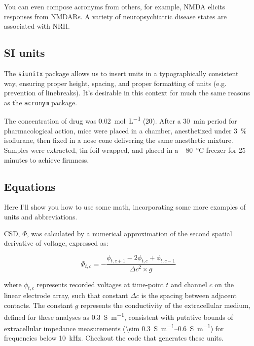\documentclass[../../main.tex]{subfiles}  %
\begin{document}
	You can even compose acronyms from others, for example, \ac{NMDA} elicits responses from \acp{NMDAR}. 
	A variety of neuropsychiatric disease states are associated with \ac{NRH}.

	\subsection{SI units}

	The \verb|siunitx| package allows us to insert units in a typographically consistent way, ensuring proper height, spacing, and proper formatting of units (e.g. prevention of linebreaks).
	It's desirable in this context for much the same reasons as the \verb|acronym| package.


	The concentration of drug was \SI[per-mode=fraction]{0.02}{\mol\per\L} (\SI{20}{\mM}).
	After a \SI{30}{\minute} period for pharmacological action, mice were placed in a chamber, anesthetized under \qty{3}{\percent} isoflurane, then fixed in a nose cone delivering the same anesthetic mixture. 
	Samples were extracted, tin foil wrapped, and placed in a \SI{-80}{\degreeCelsius} freezer for 25 minutes to achieve firmness.

	\subsection{Equations}

	Here I'll show you how to use some math, incorporating some more examples of units and abbreviations.

	\Acf{CSD}, $\Phi$, was calculated by a numerical approximation of the second spatial derivative of voltage, expressed as:

	\begin{equation}
		\Phi_{t, c} = -\frac{\phi_{t, c+1} - 2\phi_{t, c} + \phi_{t, c-1}}{\Delta c^2 \times g}
	\end{equation}

	where $\phi_{t, c}$ represents recorded voltages at time-point $t$ and channel $c$ on the linear electrode array, such that constant $\Delta c$ is the spacing between adjacent contacts. 
	The constant $g$ represents the conductivity of the extracellular medium, defined for these analyses as \SI[per-mode=fraction]{0.3}{\siemens\per\m}, consistent with putative bounds of extracellular impedance measurements (\qtyrange[range-units=single,range-phrase=-]{\sim 0.3}{0.6}{\siemens\per\m}) for frequencies below \SI{10}{\kHz}. 
	Checkout the code that generates these units. 
\end{document}
